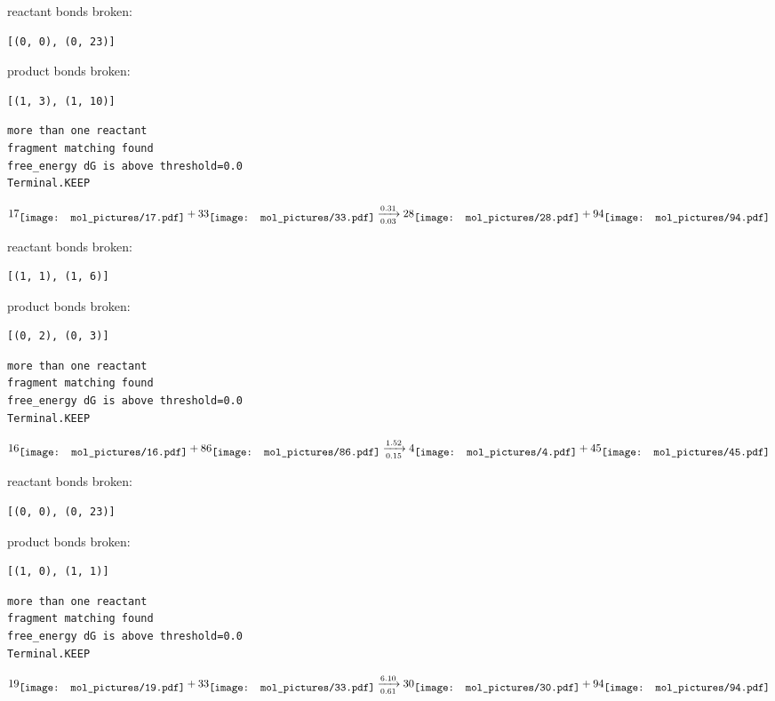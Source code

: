 \documentclass{article}
\begin{document}
reactant bonds broken:\begin{verbatim}
[(0, 0), (0, 23)]
\end{verbatim}
product bonds broken:\begin{verbatim}
[(1, 3), (1, 10)]
\end{verbatim}




\vspace{1cm}
\begin{verbatim}
more than one reactant
fragment matching found
free_energy dG is above threshold=0.0
Terminal.KEEP
\end{verbatim}
$$
17
\raisebox{-.5\height}{\texttt{[image: mol\_pictures/17.pdf]}}
+
33
\raisebox{-.5\height}{\texttt{[image: mol\_pictures/33.pdf]}}
\xrightarrow[0.03]{0.31}
28
\raisebox{-.5\height}{\texttt{[image: mol\_pictures/28.pdf]}}
+
94
\raisebox{-.5\height}{\texttt{[image: mol\_pictures/94.pdf]}}
$$


reactant bonds broken:\begin{verbatim}
[(1, 1), (1, 6)]
\end{verbatim}
product bonds broken:\begin{verbatim}
[(0, 2), (0, 3)]
\end{verbatim}




\vspace{1cm}
\begin{verbatim}
more than one reactant
fragment matching found
free_energy dG is above threshold=0.0
Terminal.KEEP
\end{verbatim}
$$
16
\raisebox{-.5\height}{\texttt{[image: mol\_pictures/16.pdf]}}
+
86
\raisebox{-.5\height}{\texttt{[image: mol\_pictures/86.pdf]}}
\xrightarrow[0.15]{1.52}
4
\raisebox{-.5\height}{\texttt{[image: mol\_pictures/4.pdf]}}
+
45
\raisebox{-.5\height}{\texttt{[image: mol\_pictures/45.pdf]}}
$$


reactant bonds broken:\begin{verbatim}
[(0, 0), (0, 23)]
\end{verbatim}
product bonds broken:\begin{verbatim}
[(1, 0), (1, 1)]
\end{verbatim}




\vspace{1cm}
\begin{verbatim}
more than one reactant
fragment matching found
free_energy dG is above threshold=0.0
Terminal.KEEP
\end{verbatim}
$$
19
\raisebox{-.5\height}{\texttt{[image: mol\_pictures/19.pdf]}}
+
33
\raisebox{-.5\height}{\texttt{[image: mol\_pictures/33.pdf]}}
\xrightarrow[0.61]{6.10}
30
\raisebox{-.5\height}{\texttt{[image: mol\_pictures/30.pdf]}}
+
94
\raisebox{-.5\height}{\texttt{[image: mol\_pictures/94.pdf]}}
$$
\end{document}
